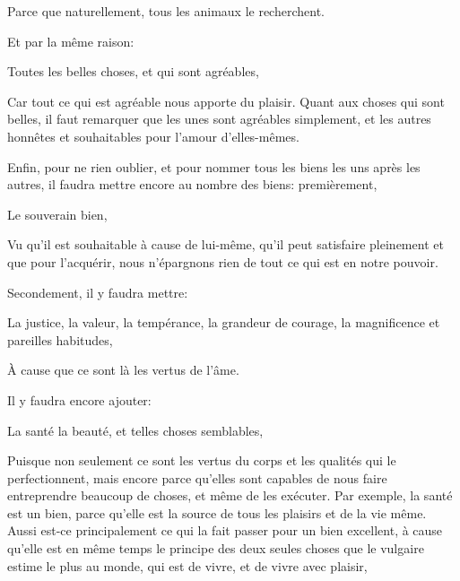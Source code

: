 Parce que naturellement, tous les animaux le recherchent.

\bigbreak

Et par la même raison:

\begin{lieu}
	Toutes les belles choses, et qui sont agréables,
\end{lieu}

Car tout ce qui est agréable nous apporte du plaisir. Quant aux choses qui sont belles, il faut remarquer que les unes sont
agréables simplement, et les autres honnêtes et souhaitables pour l'amour d'elles-mêmes. 

\bigbreak

Enfin, pour ne rien oublier, et pour nommer tous les biens les uns après les autres, il faudra mettre encore au nombre des
biens: premièrement,

\begin{lieu}
	Le souverain bien,
\end{lieu}

Vu qu'il est souhaitable à cause de lui-même, qu'il peut satisfaire pleinement et que pour l'acquérir, nous n'épargnons rien
de tout ce qui est en notre pouvoir.

\bigbreak

Secondement, il y faudra mettre:

\begin{lieu}
	La justice, la valeur, la tempérance, la grandeur de courage, la magnificence et pareilles habitudes,
\end{lieu}

À cause que ce sont là les vertus de l'âme. 

\bigbreak

Il y faudra encore ajouter:

\begin{lieu}
	La santé la beauté, et telles choses semblables,
\end{lieu}

Puisque non seulement ce sont les vertus du corps et les qualités qui le perfectionnent, mais encore parce qu'elles sont capables
de nous faire entreprendre beaucoup de choses, et même de les exécuter. Par exemple, la santé est un bien, parce qu'elle est la
source de tous les plaisirs et de la vie même. Aussi est-ce principalement ce qui la fait passer pour un bien excellent, à cause
qu'elle est en même temps le principe des deux seules choses que le vulgaire estime le plus au monde, qui est de vivre, et de vivre
avec plaisir, 

